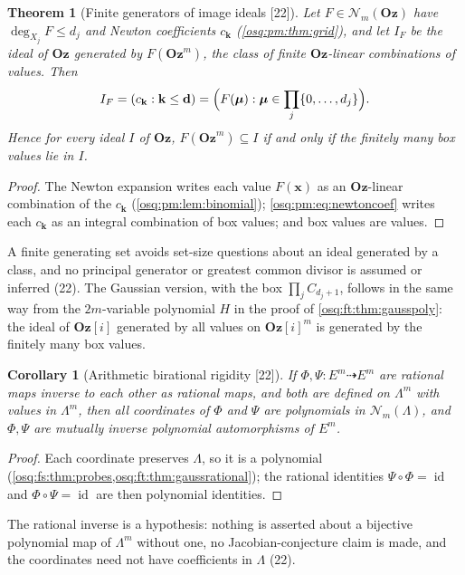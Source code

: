 \documentclass[11pt,letterpaper]{article}
\numberwithin{equation}{section}
\newtheorem{theorem}{Theorem}[section]
\newtheorem{corollary}[corollary]{Corollary}
\theoremstyle{definition}
\theoremstyle{remark}
\theoremstyle{plain}
\newcommand{\Oz}{\mathbf{Oz}}
\newcommand{\GOz}{\Oz[i]}
\newcommand{\id}{\operatorname{id}}
\newcommand{\Num}{\mathscr N}
\newcommand{\src}[1]{\textup{\textsf{[#1]}}}
\begin{document}
\begin{theorem}[Finite generators of image ideals \src{22}]\label{osq:ft:thm:ideals}
Let $F\in\Num_m(\Oz)$ have $\deg_{X_j}F\le d_j$ and Newton coefficients $c_{\mathbf k}$ (\cref{osq:pm:thm:grid}), and let $I_F$ be the ideal of $\Oz$
generated by $F(\Oz^m)$, the class of finite $\Oz$-linear combinations of values. Then
\begin{equation}\label{osq:ft:eq:imageideal}
 I_F=(c_{\mathbf k}:\mathbf k\le\mathbf d)=\Bigl(F(\boldsymbol\mu):\boldsymbol\mu\in\prod_j\{0,\dots,d_j\}\Bigr).
\end{equation}
Hence for every ideal $I$ of $\Oz$, $F(\Oz^m)\subseteq I$ if and only if the finitely many box values lie in $I$.
\end{theorem}
\begin{proof}
The Newton expansion writes each value $F(\mathbf x)$ as an $\Oz$-linear combination of the $c_{\mathbf k}$ (\cref{osq:pm:lem:binomial});
\eqref{osq:pm:eq:newtoncoef} writes each $c_{\mathbf k}$ as an integral combination of box values; and box values are values.
\end{proof}

A finite generating set avoids set-size questions about an ideal generated by a class, and no principal generator or greatest common divisor is
assumed or inferred (22). The Gaussian version, with the box $\prod_jC_{d_j+1}$, follows in the same way from the $2m$-variable polynomial $H$ in the
proof of \cref{osq:ft:thm:gausspoly}: the ideal of $\GOz$ generated by all values on $\GOz^m$ is generated by the finitely many box values.

\begin{corollary}[Arithmetic birational rigidity \src{22}]\label{osq:ft:cor:birational}
If $\Phi,\Psi:E^m\dashrightarrow E^m$ are rational maps inverse to each other as rational maps, and both are defined on $\Lambda^m$ with values in
$\Lambda^m$, then all coordinates of $\Phi$ and $\Psi$ are polynomials in $\Num_m(\Lambda)$, and $\Phi,\Psi$ are mutually inverse polynomial
automorphisms of $E^m$.
\end{corollary}
\begin{proof}
Each coordinate preserves $\Lambda$, so it is a polynomial (\cref{osq:fs:thm:probes,osq:ft:thm:gaussrational}); the rational identities
$\Psi\circ\Phi=\id$ and $\Phi\circ\Psi=\id$ are then polynomial identities.
\end{proof}

The rational inverse is a hypothesis: nothing is asserted about a bijective polynomial map of $\Lambda^m$ without one, no Jacobian-conjecture claim is
made, and the coordinates need not have coefficients in $\Lambda$ (22).
\end{document}
